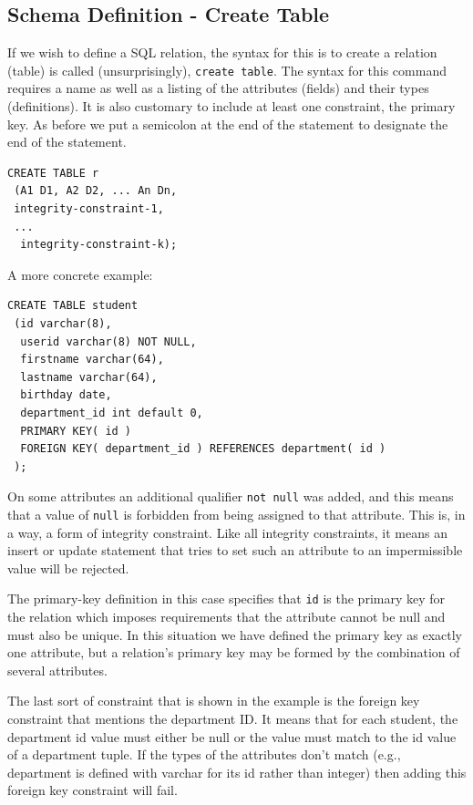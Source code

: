 \subsection*{Schema Definition - Create Table} 
If we wish to define a SQL relation, the syntax for this is to create a relation (table) is called (unsurprisingly), \texttt{create table}. The syntax for this command requires a name as well as a listing of the attributes (fields) and their types (definitions). It is also customary to include at least one constraint, the primary key. As before we put a semicolon at the end of the statement to designate the end of the statement. 


\begin{lstlisting}
CREATE TABLE r
 (A1 D1, A2 D2, ... An Dn,
 integrity-constraint-1,
 ...
  integrity-constraint-k);
\end{lstlisting}

A more concrete example: 

\begin{verbatim}
CREATE TABLE student
 (id varchar(8),
  userid varchar(8) NOT NULL,
  firstname varchar(64),
  lastname varchar(64),
  birthday date,
  department_id int default 0,
  PRIMARY KEY( id )
  FOREIGN KEY( department_id ) REFERENCES department( id )
 );
\end{verbatim}


On some attributes an additional qualifier \texttt{not null} was added, and this means that a value of \texttt{null} is forbidden from being assigned to that attribute. This is, in a way, a form of integrity constraint. Like all integrity constraints, it means an insert or update statement that tries to set such an attribute to an impermissible value will be rejected. 

The primary-key definition in this case specifies that \texttt{id} is the primary key for the relation which imposes requirements that the attribute cannot be null and must also be unique. In this situation we have defined the primary key as exactly one attribute, but a relation's primary key may be formed by the combination of several attributes. 
 
The last sort of constraint that is shown in the example is the foreign key constraint that mentions the department ID. It means that for each student, the department id value must either be null or the value must match to the id value of a department tuple. If the types of the attributes don't match (e.g., department is defined with varchar for its id rather than integer) then adding this foreign key constraint will fail. 

